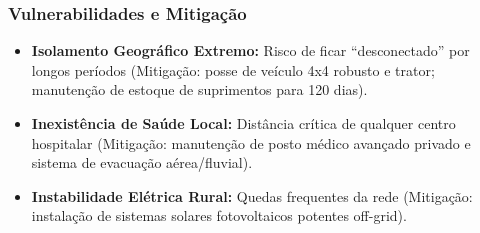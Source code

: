 \subsubsection{Vulnerabilidades e
Mitigação}

\begin{itemize}
\tightlist
\item
  \textbf{Isolamento Geográfico Extremo:} Risco de ficar
  ``desconectado'' por longos períodos (Mitigação: posse de veículo 4x4
  robusto e trator; manutenção de estoque de suprimentos para 120 dias).
\item
  \textbf{Inexistência de Saúde Local:} Distância crítica de qualquer
  centro hospitalar (Mitigação: manutenção de posto médico avançado
  privado e sistema de evacuação aérea/\allowbreak fluvial).
\item
  \textbf{Instabilidade Elétrica Rural:} Quedas frequentes da rede
  (Mitigação: instalação de sistemas solares fotovoltaicos potentes
  off-grid).
\end{itemize}

